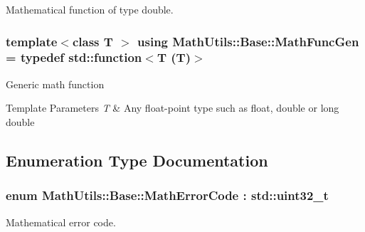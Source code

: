 Mathematical function of type double. 

\hypertarget{namespaceMathUtils_1_1Base_a99755ccc9707a5ae2e93b4d9fbeb4391}{
\subsubsection[{Math\-Func\-Gen}]{\setlength{\rightskip}{0pt plus 5cm}template$<$class T $>$ using {\bf Math\-Utils\-::\-Base\-::\-Math\-Func\-Gen} = typedef std\-::function$<$T (T)$>$}}\label{namespaceMathUtils_1_1Base_a99755ccc9707a5ae2e93b4d9fbeb4391}
Generic math function 
\begin{DoxyTemplParams}{Template Parameters}
{\em T} & Any float-\/point type such as float, double or long double \\
\hline
\end{DoxyTemplParams}


\subsection{Enumeration Type Documentation}
\hypertarget{namespaceMathUtils_1_1Base_aac4088d82202217a0cea2b81ec0649a2}{
\subsubsection[{Math\-Error\-Code}]{\setlength{\rightskip}{0pt plus 5cm}enum {\bf Math\-Utils\-::\-Base\-::\-Math\-Error\-Code} \-: std\-::uint32\-\_\-t\hspace{0.3cm}{\ttfamily [strong]}}}\label{namespaceMathUtils_1_1Base_aac4088d82202217a0cea2b81ec0649a2}


Mathematical error code. 

